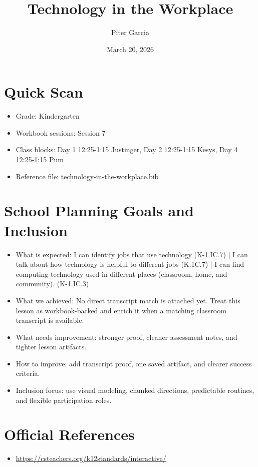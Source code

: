\documentclass[11pt]{article}
\title{Technology in the Workplace}
\author{Piter Garcia}
\date{March 20, 2026}
\begin{document}
\maketitle
\section*{Quick Scan}
\begin{itemize}[leftmargin=*]
\item Grade: Kindergarten
\item Workbook sessions: Session 7
\item Class blocks: Day 1 12:25-1:15 Justinger, Day 2 12:25-1:15 Kesys, Day 4 12:25-1:15 Pum
\item Reference file: technology-in-the-workplace.bib
\end{itemize}
\section*{School Planning Goals and Inclusion}
\begin{itemize}[leftmargin=*]
\item What is expected: I can identify jobs that use technology (K-1.IC.7) | I can talk about how technology is helpful to different jobs (K.1C.7) | I can find computing technology used in different places (classroom, home, and community). (K-1.IC.3)
\item What we achieved: No direct transcript match is attached yet. Treat this lesson as workbook-backed and enrich it when a matching classroom transcript is available.
\item What needs improvement: stronger proof, cleaner assessment notes, and tighter lesson artifacts.
\item How to improve: add transcript proof, one saved artifact, and clearer success criteria.
\item Inclusion focus: use visual modeling, chunked directions, predictable routines, and flexible participation roles.
\end{itemize}
\section*{Official References}
\begin{itemize}[leftmargin=*]
\item \url{https://csteachers.org/k12standards/interactive/}

\end{itemize}
\end{document}

